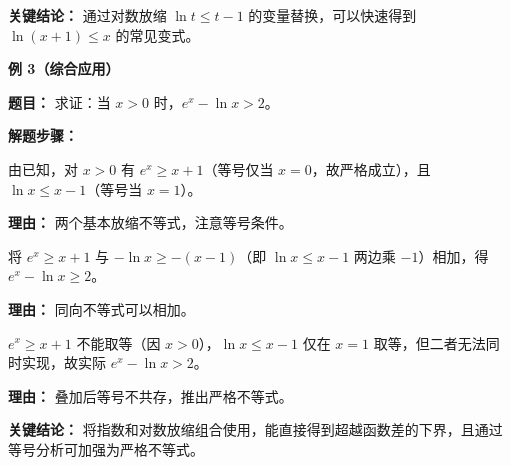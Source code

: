 \begin{examplebox}
	\textbf{\textcolor{CExample}{关键结论：}}
	通过对数放缩 $\ln t \le t-1$ 的变量替换，可以快速得到 $\ln(x+1) \le x$ 的常见变式。

	\medskip
	\textbf{\textcolor{CExample}{例 3（综合应用）}}

	\textbf{\textcolor{CExample}{题目：}}
	求证：当 $x>0$ 时，$e^{x} - \ln x > 2$。

	\textbf{\textcolor{CExample}{解题步骤：}}
	\begin{description}[style=nextline, leftmargin=2.8em, labelsep=0.5em, itemsep=0.45em]
		\item[\textbf{第一步（分别放缩）：}] 由已知，对 $x>0$ 有 $e^{x} \ge x+1$（等号仅当 $x=0$，故严格成立），且 $\ln x \le x-1$（等号当 $x=1$）。
			\par\textbf{理由：} 两个基本放缩不等式，注意等号条件。
		\item[\textbf{第二步（同向相加）：}] 将 $e^{x} \ge x+1$ 与 $-\ln x \ge -(x-1)$（即 $\ln x \le x-1$ 两边乘 $-1$）相加，得 $e^{x} - \ln x \ge 2$。
			\par\textbf{理由：} 同向不等式可以相加。
		\item[\textbf{第三步（分析取等）：}] $e^{x} \ge x+1$ 不能取等（因 $x>0$），$\ln x \le x-1$ 仅在 $x=1$ 取等，但二者无法同时实现，故实际 $e^{x} - \ln x > 2$。
			\par\textbf{理由：} 叠加后等号不共存，推出严格不等式。
	\end{description}

	\textbf{\textcolor{CExample}{关键结论：}}
	将指数和对数放缩组合使用，能直接得到超越函数差的下界，且通过等号分析可加强为严格不等式。
\end{examplebox}
